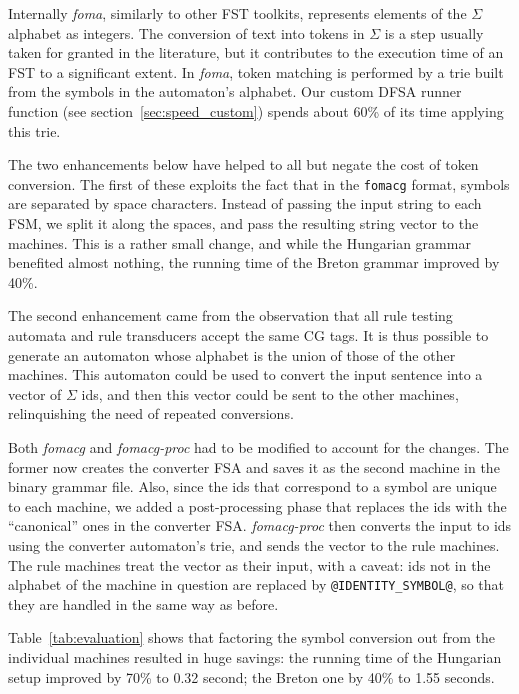 \documentclass[11pt]{article}
\begin{document}
Internally \emph{foma}, similarly to other FST toolkits, represents elements
of the $\Sigma$ alphabet as integers. The conversion of text into tokens in
$\Sigma$ is a step usually taken for granted in the literature, but it
contributes to the execution time of an FST to a significant extent. In
\emph{foma}, token matching is performed by a trie built from the symbols in
the automaton's alphabet. Our custom DFSA runner function (see
section~\ref{sec:speed_custom}) spends about 60\% of its time applying this trie.

The two enhancements below have helped to all but negate the cost of token
conversion. The first of these exploits the fact that in the \texttt{fomacg}
format, symbols are separated by space characters. Instead of passing the
input string to each FSM, we split it along the spaces, and pass the resulting
string vector to the machines. This is a rather small change, and while the
Hungarian grammar benefited almost nothing, the running time of the Breton
grammar improved by 40\%.

The second enhancement came from the observation that all rule testing automata
and rule transducers accept the same CG tags. It is thus possible to generate an
automaton whose alphabet is the union of those of the other machines. This
automaton could be used to convert the input sentence into a vector of $\Sigma$
ids, and then this vector could be sent to the other machines, relinquishing the
need of repeated conversions.

Both \emph{fomacg} and \emph{fomacg-proc} had to be modified to account for the
changes. The former now creates the converter FSA and saves it as the
second machine in the binary grammar file. Also, since the ids that correspond
to a symbol are unique to each machine, we added a post-processing phase that
replaces the ids with the ``canonical'' ones in the converter FSA. 
\emph{fomacg-proc} then converts the input to ids using the converter
automaton's trie, and sends the vector to the rule machines. The rule machines
treat the vector as their input, with a caveat: ids not in the alphabet of the
machine in question are replaced by \texttt{@IDENTITY\_SYMBOL@}, so that they
are handled in the same way as before.

Table~\ref{tab:evaluation} shows that factoring the symbol conversion out from
the individual machines resulted in huge savings: the running time of the
Hungarian setup improved by 70\% to 0.32 second; the Breton one by 40\% to 1.55
seconds.
\end{document}

